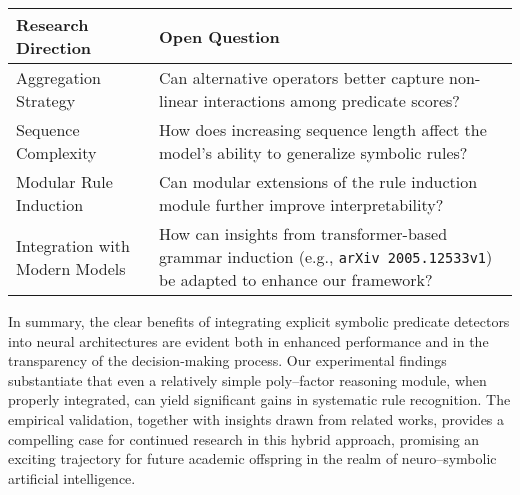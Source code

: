 \documentclass{article}
\begin{document}
\begin{table}[h]
\centering
\begin{tabular}{|l|l|}
\hline
\textbf{Research Direction}   & \textbf{Open Question} \\ \hline
Aggregation Strategy          & Can alternative operators better capture non-linear interactions among predicate scores? \\ \hline
Sequence Complexity           & How does increasing sequence length affect the model's ability to generalize symbolic rules? \\ \hline
Modular Rule Induction        & Can modular extensions of the rule induction module further improve interpretability? \\ \hline
Integration with Modern Models & How can insights from transformer-based grammar induction (e.g., \texttt{arXiv 2005.12533v1}) be adapted to enhance our framework? \\ \hline
\end{tabular}
\label{tab:future}
\end{table}

In summary, the clear benefits of integrating explicit symbolic predicate detectors into neural architectures are evident both in enhanced performance and in the transparency of the decision-making process. Our experimental findings substantiate that even a relatively simple poly–factor reasoning module, when properly integrated, can yield significant gains in systematic rule recognition. The empirical validation, together with insights drawn from related works, provides a compelling case for continued research in this hybrid approach, promising an exciting trajectory for future academic offspring in the realm of neuro–symbolic artificial intelligence.
\end{document}
